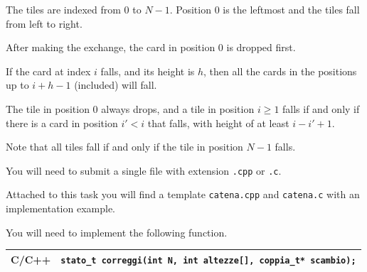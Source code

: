 \begin{mdframed}[backgroundcolor=black!10,rightline=false,leftline=false]

\Specs

\small

The tiles are indexed from $0$ to $N-1$.
Position $0$ is the leftmost and the tiles fall from left to right.

After making the exchange, the card in position $0$ is dropped first.

If the card at index $i$ falls, and its height is $h$, then all the cards in the positions up to $i+h-1$ (included) will fall.

The tile in position $0$ always drops, and a tile in position $i \geq 1$
falls if and only if there is a card in position $i' < i$ that falls, with height of at least $i-i'+1$.

Note that all tiles fall if and only if the tile in position $N-1$ falls.

\end{mdframed}

\pagebreak


\Implementation


You will need to submit a single file with extension \texttt{.cpp} or \texttt{.c}.

\begin{warning}
Attached to this task you will find a template \texttt{catena.cpp} and \texttt{catena.c}
with an implementation example.
\end{warning}

You will need to implement the following function.

\begin{center}\begin{tabularx}{\textwidth}{|c|X|}
\hline
C/C++  & \verb|stato_t correggi(int N, int altezze[], coppia_t* scambio);|\\
\hline
\end{tabularx}\end{center}

